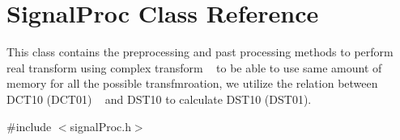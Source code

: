 \hypertarget{classSignalProc}{}\section{Signal\+Proc Class Reference}
\label{classSignalProc}


This class contains the preprocessing and past processing methods to perform real transform using complex transform ~\newline
 to be able to use same amount of memory for all the possible transfmroation, we utilize the relation between D\+C\+T10 (D\+C\+T01) ~\newline
 and D\+S\+T10 to calculate D\+S\+T10 (D\+S\+T01).  




{\ttfamily \#include $<$signal\+Proc.\+h$>$}

